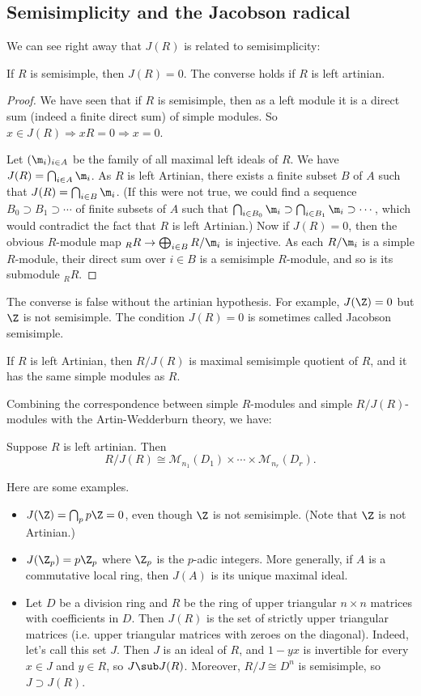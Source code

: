 \subsection{Semisimplicity and the Jacobson radical}
We can see right away that $J(R)$ is related to semisimplicity:
\begin{theorem}
If $R$ is semisimple, then $J(R)=0$. The converse holds if $R$ is left artinian.
\end{theorem}
\begin{proof}
We have seen that if $R$ is semisimple, then as a left module it is a direct sum (indeed a finite direct sum) of simple modules. So $x\in J(R)\Rightarrow xR=0\Rightarrow x=0$.\par
Let $(\m_i)_{i\in A}$ be the family of all maximal left ideals of $R$. We have $J(R)=\bigcap_{i\in A}\m_i$. As $R$ is left Artinian, there exists a finite subset $B$ of $A$ such that $J(R)=\bigcap_{i\in B}\m_i$. (If this were not true, we could find a sequence $B_0\supset B_1\supset\cdots$ of finite subsets of $A$ such that $\bigcap_{i\in B_0}\m_i\supset\bigcap_{i\in B_1}\m_i\supset\cdots$, which would contradict the fact that $R$ is left Artinian.) Now if $J(R)=0$, then the obvious $R$-module map $_{R}R\to\bigoplus_{i\in B}R/\m_i$ is injective. As each $R/\m_i$ is a simple $R$-module, their direct sum over $i\in B$ is a semisimple $R$-module, and so is its submodule $_{R}R$.
\end{proof}
The converse is false without the artinian hypothesis. For example, $J(\Z)=0$ but $\Z$ is not semisimple. The condition $J(R)=0$ is sometimes called Jacobson semisimple.
\begin{corollary}
If $R$ is left Artinian, then $R/J(R)$ is maximal semisimple quotient of $R$, and it has the same simple modules as $R$.
\end{corollary}
Combining the correspondence between simple $R$-modules and simple $R/J(R)$-modules with the Artin-Wedderburn theory, we have:
\begin{theorem}
Suppose $R$ is left artinian. Then
\[R/J(R)\cong\mathcal{M}_{n_1}(D_1)\times\cdots\times\mathcal{M}_{n_r}(D_r).\]
\end{theorem}
\begin{example}
Here are some examples.
\begin{itemize}
\item $J(\Z)=\bigcap_{p}p\Z=0$, even though $\Z$ is not semisimple. (Note that $\Z$ is not Artinian.)
\item $J(\Z_p)=p\Z_p$ where $\Z_p$ is the $p$-adic integers. More generally, if $A$ is a commutative local ring, then $J(A)$ is its unique maximal ideal.
\item Let $D$ be a division ring and $R$ be the ring of upper triangular $n\times n$ matrices with coefficients in $D$. Then $J(R)$ is the set of strictly upper triangular matrices (i.e. upper triangular matrices with zeroes on the diagonal). Indeed, let's call this set $J$. Then $J$ is an ideal of $R$, and $1-yx$ is invertible for every $x\in J$ and $y\in R$, so $J\sub J(R)$. Moreover, $R/J\cong D^n$ is semisimple, so $J\supset J(R)$.
\end{itemize}
\end{example}
